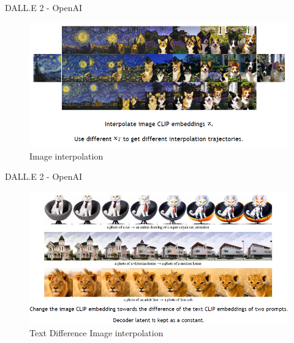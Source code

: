 \begin{frame}{DALL.E 2 - OpenAI}
\begin{figure}
    \centering
    \includegraphics[height=0.8\textheight, width=\textwidth, keepaspectratio]{images/diffusion/diff_results_5.png}
    \caption*{Image interpolation}
\end{figure}


\end{frame}

\begin{frame}{DALL.E 2 - OpenAI}
\begin{figure}
    \centering
    \includegraphics[height=0.8\textheight, width=\textwidth, keepaspectratio]{images/diffusion/diff_results_6.png}
    \caption*{Text Difference Image interpolation}
\end{figure}


\end{frame}